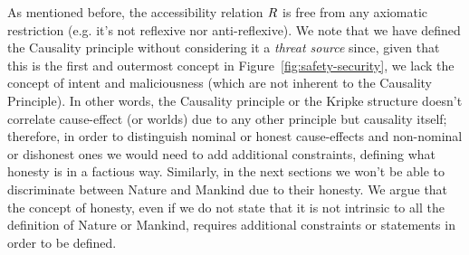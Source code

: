 As mentioned before, the accessibility relation $R$ is free from
any axiomatic restriction (e.g. it's not reflexive nor anti-reflexive).  We
note that we have defined the Causality principle without considering it a
\emph{threat source} since, given that this is the first and outermost concept
in Figure~\ref{fig:safety-security}, we lack the concept of intent and
maliciousness (which are not inherent to the Causality Principle). 
In other words, the Causality principle or the Kripke structure
doesn't correlate cause-effect (or worlds) due to any other principle but
causality itself; therefore, in order to distinguish nominal or honest cause-effects
and non-nominal or dishonest ones we would need to add additional constraints, defining
what honesty is in a factious way.
Similarly, in the next sections we won't be able to discriminate between Nature
and Mankind due to their honesty. We argue that the concept of honesty, even if
we do not state that it is not intrinsic to all the definition of Nature or
Mankind, requires additional constraints or statements in order to be defined.


